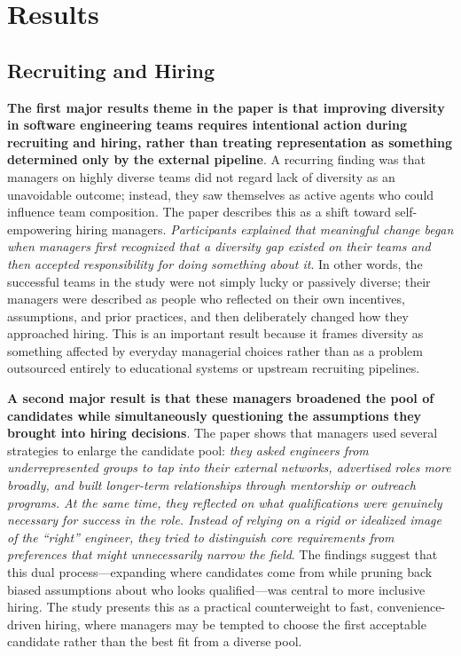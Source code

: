 \section{Results}

\subsection{Recruiting and Hiring}
\textbf{The first major results theme in the paper is that improving diversity in software engineering teams requires intentional action during recruiting and hiring, rather than treating representation as something determined only by the external pipeline}. A recurring finding was that managers on highly diverse teams did not regard lack of diversity as an unavoidable outcome; instead, they saw themselves as active agents who could influence team composition. The paper describes this as a shift toward self-empowering hiring managers. \textit{Participants explained that meaningful change began when managers first recognized that a diversity gap existed on their teams and then accepted responsibility for doing something about it}. In other words, the successful teams in the study were not simply lucky or passively diverse; their managers were described as people who reflected on their own incentives, assumptions, and prior practices, and then deliberately changed how they approached hiring. This is an important result because it frames diversity as something affected by everyday managerial choices rather than as a problem outsourced entirely to educational systems or upstream recruiting pipelines.

\textbf{A second major result is that these managers broadened the pool of candidates while simultaneously questioning the assumptions they brought into hiring decisions}. The paper shows that managers used several strategies to enlarge the candidate pool: \textit{they asked engineers from underrepresented groups to tap into their external networks, advertised roles more broadly, and built longer-term relationships through mentorship or outreach programs. At the same time, they reflected on what qualifications were genuinely necessary for success in the role. Instead of relying on a rigid or idealized image of the “right” engineer, they tried to distinguish core requirements from preferences that might unnecessarily narrow the field}. The findings suggest that this dual process—expanding where candidates come from while pruning back biased assumptions about who looks qualified—was central to more inclusive hiring. The study presents this as a practical counterweight to fast, convenience-driven hiring, where managers may be tempted to choose the first acceptable candidate rather than the best fit from a diverse pool.

